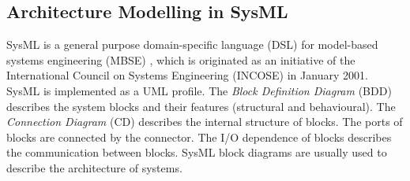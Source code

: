 \subsection{Architecture Modelling in SysML}

\begin{figure}[htbp]
\end{figure}


SysML is a general purpose domain-specific language (DSL) \cite{SemerathBHSV17} for model-based systems engineering (MBSE) \cite{Dori16}, which is originated as an initiative of the International Council on Systems Engineering (INCOSE) \cite{Pepper2015International} in January 2001. SysML is implemented as a UML profile. The \textit{Block Definition Diagram }(BDD) describes the system blocks and their features (structural and behavioural). The\textit{ Connection Diagram} (CD) describes the internal structure of blocks. The ports of blocks are connected by the connector. The I/O dependence of blocks describes the communication between blocks. SysML block diagrams are usually used to describe the architecture of systems.

